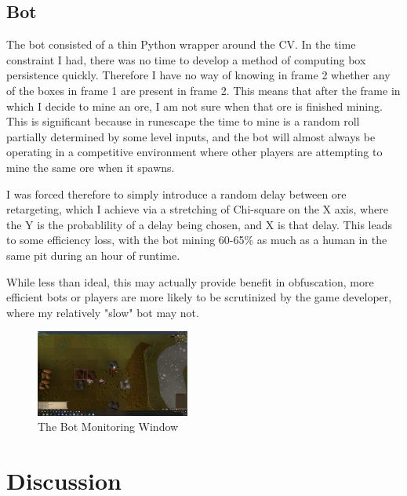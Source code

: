 \documentclass[sigconf]{acmart}
\begin{document}
\subsection{Bot}

The bot consisted of a thin Python wrapper around the CV. In the time constraint I had, there was no time to develop a method of computing box persistence quickly. Therefore I have no way of knowing in frame 2 whether any of the boxes in frame 1 are present in frame 2. This means that after the frame in which I decide to mine an ore, I am not sure when that ore is finished mining. This is significant because in runescape the time to mine is a random roll partially determined by some level inputs, and the bot will almost always be operating in a competitive environment where other players are attempting to mine the same ore when it spawns.

I was forced therefore to simply introduce a random delay between ore retargeting, which I achieve via a stretching of Chi-square on the X axis, where the Y is the probablility of a delay being chosen, and X is that delay. This leads to some efficiency loss, with the bot mining 60-65\% as much as a human in the same pit during an hour of runtime.

While less than ideal, this may actually provide benefit in obfuscation, more efficient bots or players are more likely to be scrutinized by the game developer, where my relatively "slow" bot may not.

\begin{figure}[h]
  \includegraphics[width=0.45\textwidth]{botaction.PNG}
  \caption{The Bot Monitoring Window}
  \label{fig:botaction}
\end{figure}

\section{Discussion}
\end{document}
